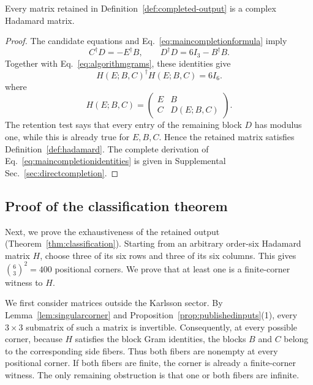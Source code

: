 \begin{proposition}
\label{prop:algorithmvalid}
Every matrix retained in Definition~\ref{def:completed-output} is a complex Hadamard matrix.
\end{proposition}

\begin{proof}
The candidate equations and Eq.~\eqref{eq:maincompletionformula} imply
\begin{equation}
C^{\dagger}D=-E^{\dagger}B,
\qquad
D^{\dagger}D=6I_3-B^{\dagger}B.
\label{eq:maincompletionidentities}
\end{equation}
Together with Eq.~\eqref{eq:algorithmgrams}, these identities give
\begin{equation}
H(E;B,C)^{\dagger}H(E;B,C)=6I_6.
\label{eq:mainoutputunitarity}
\end{equation}
where 
\begin{equation}
H(E;B,C)=
\begin{pmatrix}
E&B\\
C&D(E;B,C)
\end{pmatrix}.
\label{eq:algorithmoutputmatrix}
\end{equation}
The retention test says that every entry of the remaining block $D$ has modulus one, while this is already true for $E,B,C$. Hence the retained matrix satisfies Definition~\ref{def:hadamard}. The complete derivation of Eq.~\eqref{eq:maincompletionidentities} is given in Supplemental Sec.~\ref{sec:directcompletion}.
\end{proof}

\subsection{Proof of the classification theorem}

Next, we prove the exhaustiveness of the retained output (Theorem~\ref{thm:classification}). Starting from an arbitrary order-six Hadamard matrix $H$, choose three of its six rows and three of its six columns. This gives $\binom{6}{3}^2=400$ positional corners. We prove that at least one is a finite-corner witness to $H$.

We first consider matrices outside the Karlsson sector. By Lemma~\ref{lem:singularcorner} and Proposition~\ref{prop:publishedinputs}(1), every $3\times3$ submatrix of such a matrix is invertible. Consequently, at every possible corner, because $H$ satisfies the block Gram identities, the blocks $B$ and $C$ belong to the corresponding side fibers. Thus both fibers are nonempty at every positional corner. If both fibers are finite, the corner is already a finite-corner witness. The only remaining obstruction is that one or both fibers are infinite.

